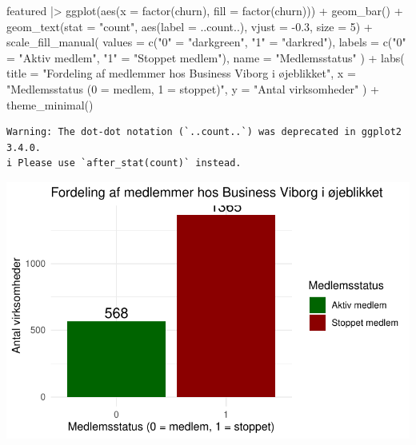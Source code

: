 \documentclass[
  11pt,
  letterpaper,
  DIV=11,
  numbers=noendperiod]{scrartcl}
\newenvironment{Shaded}{\begin{snugshade}}{\end{snugshade}}
\newcommand{\AttributeTok}[1]{\textcolor[rgb]{0.40,0.45,0.13}{#1}}
\newcommand{\DecValTok}[1]{\textcolor[rgb]{0.68,0.00,0.00}{#1}}
\newcommand{\FloatTok}[1]{\textcolor[rgb]{0.68,0.00,0.00}{#1}}
\newcommand{\FunctionTok}[1]{\textcolor[rgb]{0.28,0.35,0.67}{#1}}
\newcommand{\NormalTok}[1]{\textcolor[rgb]{0.00,0.23,0.31}{#1}}
\newcommand{\OtherTok}[1]{\textcolor[rgb]{0.00,0.23,0.31}{#1}}
\newcommand{\SpecialCharTok}[1]{\textcolor[rgb]{0.37,0.37,0.37}{#1}}
\newcommand{\StringTok}[1]{\textcolor[rgb]{0.13,0.47,0.30}{#1}}
\begin{document}
\begin{Shaded}
\begin{Highlighting}[]
\NormalTok{featured }\SpecialCharTok{|\textgreater{}} 
  \FunctionTok{ggplot}\NormalTok{(}\FunctionTok{aes}\NormalTok{(}\AttributeTok{x =} \FunctionTok{factor}\NormalTok{(churn), }\AttributeTok{fill =} \FunctionTok{factor}\NormalTok{(churn))) }\SpecialCharTok{+}
  \FunctionTok{geom\_bar}\NormalTok{() }\SpecialCharTok{+}
  \FunctionTok{geom\_text}\NormalTok{(}\AttributeTok{stat =} \StringTok{"count"}\NormalTok{, }\FunctionTok{aes}\NormalTok{(}\AttributeTok{label =}\NormalTok{ ..count..), }\AttributeTok{vjust =} \SpecialCharTok{{-}}\FloatTok{0.3}\NormalTok{, }\AttributeTok{size =} \DecValTok{5}\NormalTok{) }\SpecialCharTok{+}
  \FunctionTok{scale\_fill\_manual}\NormalTok{(}
    \AttributeTok{values =} \FunctionTok{c}\NormalTok{(}\StringTok{"0"} \OtherTok{=} \StringTok{"darkgreen"}\NormalTok{, }\StringTok{"1"} \OtherTok{=} \StringTok{"darkred"}\NormalTok{),}
    \AttributeTok{labels =} \FunctionTok{c}\NormalTok{(}\StringTok{"0"} \OtherTok{=} \StringTok{"Aktiv medlem"}\NormalTok{, }\StringTok{"1"} \OtherTok{=} \StringTok{"Stoppet medlem"}\NormalTok{),}
    \AttributeTok{name =} \StringTok{"Medlemsstatus"}
\NormalTok{  ) }\SpecialCharTok{+}
  \FunctionTok{labs}\NormalTok{(}
    \AttributeTok{title =} \StringTok{"Fordeling af medlemmer hos Business Viborg i øjeblikket"}\NormalTok{,}
    \AttributeTok{x =} \StringTok{"Medlemsstatus (0 = medlem, 1 = stoppet)"}\NormalTok{,}
    \AttributeTok{y =} \StringTok{"Antal virksomheder"}
\NormalTok{  ) }\SpecialCharTok{+}
  \FunctionTok{theme\_minimal}\NormalTok{()}
\end{Highlighting}
\end{Shaded}

\begin{verbatim}
Warning: The dot-dot notation (`..count..`) was deprecated in ggplot2 3.4.0.
i Please use `after_stat(count)` instead.
\end{verbatim}

\includegraphics{Quarto_files/figure-pdf/unnamed-chunk-6-1.pdf}
\end{document}
